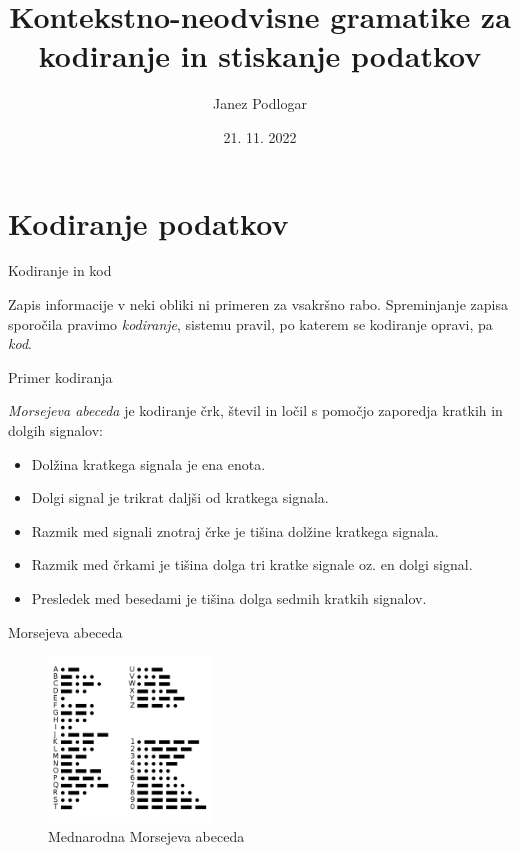 \documentclass{beamer}
\title[Gramatike za kodiranje podatkov]{Kontekstno-neodvisne gramatike za kodiranje in stiskanje podatkov}
\author{Janez Podlogar}
\institute[UL-FMF]{Univerza v Ljubljani, Fakulteta za matematiko in fiziko}
\date[November 2022]{21. 11. 2022}
\theoremstyle{definition} %
\theoremstyle{plain} %
\begin{document}
\begin{frame}
    \titlepage
\end{frame}

\section{Kodiranje podatkov}

\begin{frame}{Kodiranje in kod}
    
    Zapis informacije v neki obliki ni primeren za vsakršno rabo. Spreminjanje zapisa sporočila
    pravimo \textit{kodiranje}, sistemu pravil, po katerem se kodiranje opravi, pa \textit{kod}.

\end{frame}

\begin{frame}{Primer kodiranja}

    \textit{Morsejeva abeceda} je kodiranje črk, števil in ločil s pomočjo zaporedja kratkih
    in dolgih signalov:

    \begin{itemize}
        \item Dolžina kratkega signala je ena enota.
        \item Dolgi signal je trikrat daljši od kratkega signala.
        \item Razmik med signali znotraj črke je tišina dolžine kratkega signala.
        \item Razmik med črkami je tišina dolga tri kratke signale oz. en dolgi signal.
        \item Presledek med besedami je tišina dolga sedmih kratkih signalov.
    \end{itemize}

\end{frame}

\begin{frame}{Morsejeva abeceda}

    \begin{figure}[h]
        \centering
        \includegraphics[width=4.3cm]{International_Morse_Code.svg.png}
        \caption{Mednarodna Morsejeva abeceda}
    \end{figure}
    
\end{frame}
\end{document}
